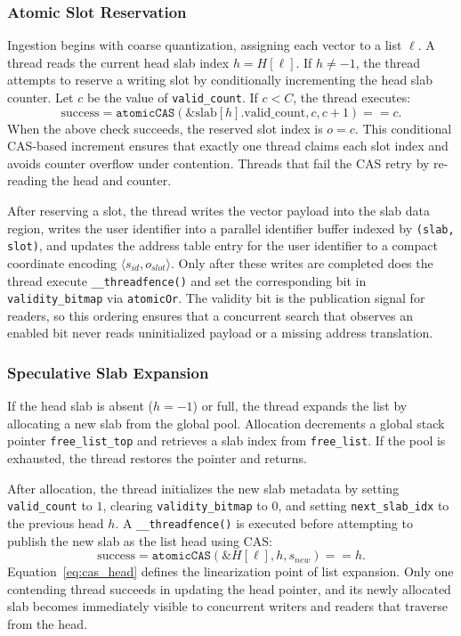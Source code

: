 \documentclass[sigconf,anonymous]{acmart}
\theoremstyle{plain}
\theoremstyle{definition}
\theoremstyle{remark}
\begin{document}
\subsubsection{Atomic Slot Reservation}
\label{sub:atomic_reservation}

Ingestion begins with coarse quantization, assigning each vector to a list $\ell$. A thread reads the current head slab index $h = H[\ell]$. If $h \neq -1$, the thread attempts to reserve a writing slot by conditionally incrementing the head slab counter. Let $c$ be the value of \texttt{valid\_count}. If $c < C$, the thread executes:
\begin{equation}
\label{eq:cas_count}
\text{success} =
\texttt{atomicCAS}(\&\text{slab}[h].\text{valid\_count}, c, c+1) == c .
\end{equation}
When the above check succeeds, the reserved slot index is $o=c$. This conditional CAS-based increment ensures that exactly one thread claims each slot index and avoids counter overflow under contention. Threads that fail the CAS retry by re-reading the head and counter.

After reserving a slot, the thread writes the vector payload into the slab data region, writes the user identifier into a parallel identifier buffer indexed by \texttt{(slab, slot)}, and updates the address table entry for the user identifier to a compact coordinate encoding $\langle s_{id}, o_{slot} \rangle$. Only after these writes are completed does the thread execute \verb|__threadfence()| and set the corresponding bit in \texttt{validity\_bitmap} via \texttt{atomicOr}. The validity bit is the publication signal for readers, so this ordering ensures that a concurrent search that observes an enabled bit never reads uninitialized payload or a missing address translation.

\subsubsection{Speculative Slab Expansion}
\label{sub:dynamic_expansion}

If the head slab is absent ($h=-1$) or full, the thread expands the list by allocating a new slab from the global pool. Allocation decrements a global stack pointer \texttt{free\_list\_top} and retrieves a slab index from \texttt{free\_list}. If the pool is exhausted, the thread restores the pointer and returns.

After allocation, the thread initializes the new slab metadata by setting \texttt{valid\_count} to $1$, clearing \texttt{validity\_bitmap} to $0$, and setting \texttt{next\_slab\_idx} to the previous head $h$. A \verb|__threadfence()| is executed before attempting to publish the new slab as the list head using CAS:
\begin{equation}
\label{eq:cas_head}
\text{success} = \texttt{atomicCAS}(\&H[\ell], h, s_{new}) == h .
\end{equation}
Equation~\ref{eq:cas_head} defines the linearization point of list expansion. Only one contending thread succeeds in updating the head pointer, and its newly allocated slab becomes immediately visible to concurrent writers and readers that traverse from the head.
\end{document}
